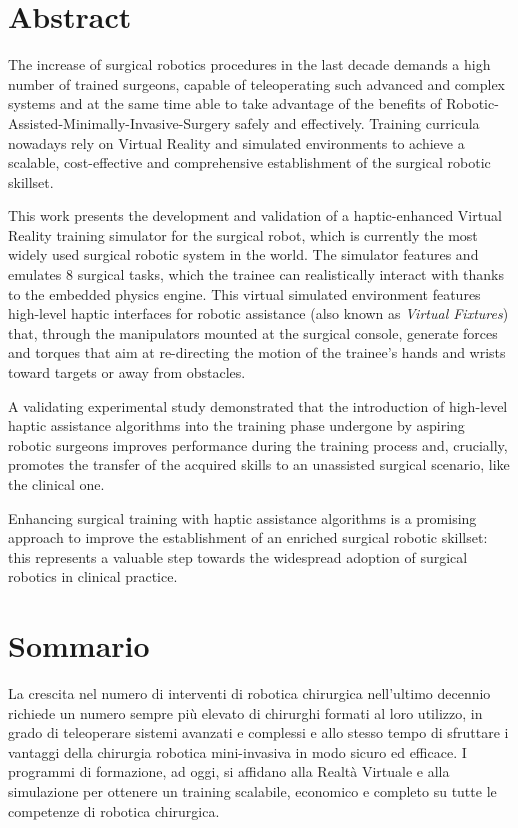 \documentclass[../main.tex]{subfiles}
\begin{document}
\chapter*{Abstract}
The increase of surgical robotics procedures in the last decade demands a high number of trained surgeons, capable of teleoperating such advanced and complex systems and at the same time able to take advantage of the benefits of Robotic-Assisted-Minimally-Invasive-Surgery safely and effectively. Training curricula nowadays rely on Virtual Reality and simulated environments to achieve a scalable, cost-effective and comprehensive establishment of the surgical robotic skillset.

This work presents the development and validation of a haptic-enhanced Virtual Reality training simulator for the \davinci surgical robot, which is currently the most widely used surgical robotic system in the world. The simulator features and emulates 8 surgical tasks, which the trainee can realistically interact with thanks to the embedded physics engine. This virtual simulated environment features high-level haptic interfaces for robotic assistance (also known as \textit{Virtual Fixtures}) that, through the manipulators mounted at the surgical console, generate forces and torques that aim at re-directing the motion of the trainee's hands and wrists toward targets or away from obstacles. 

A validating experimental study demonstrated that the introduction of high-level haptic assistance algorithms into the training phase undergone by aspiring robotic surgeons improves performance during the training process and, crucially, promotes the transfer of the acquired skills to an unassisted surgical scenario, like the clinical one. 

Enhancing surgical training with haptic assistance algorithms is a promising approach to improve the establishment of an enriched surgical robotic skillset: this represents a valuable step towards the widespread adoption of surgical robotics in clinical practice.


\newpage\newpage
{}
\chapter*{Sommario}
La crescita nel numero di interventi di robotica chirurgica nell'ultimo decennio richiede un numero sempre più elevato di chirurghi formati al loro utilizzo, in grado di teleoperare sistemi avanzati e complessi e allo stesso tempo di sfruttare i vantaggi della chirurgia robotica mini-invasiva in modo sicuro ed efficace. I programmi di formazione, ad oggi, si affidano alla Realtà Virtuale e alla simulazione per ottenere un training scalabile, economico e completo su tutte le competenze di robotica chirurgica.
\end{document}
